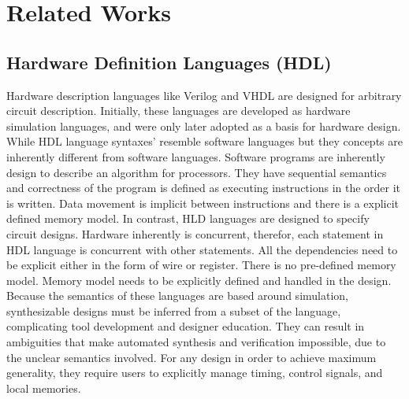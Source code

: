 

\chapter{Related Works}

\section{Hardware Definition Languages (HDL)}

Hardware description languages like Verilog and VHDL are designed for arbitrary circuit description.
Initially, these languages are developed as hardware simulation languages, and were only later adopted as a basis for hardware design.
While HDL language syntaxes' resemble software languages but they concepts are inherently different from software languages.
Software programs are inherently design to describe an algorithm for processors.
They have sequential semantics and correctness of the program is defined as executing instructions in the order it is written. Data movement is implicit between instructions and there is a explicit defined memory model.
In contrast, HLD languages are designed to specify circuit designs.
Hardware inherently is concurrent, therefor, each statement in HDL language is concurrent with other statements.
All the dependencies need to be explicit either in the form of wire or register.
There is no pre-defined memory model. Memory model needs to be explicitly defined and handled in the design.
Because the semantics of these languages are based around simulation, synthesizable designs must be inferred from a subset of the language, complicating tool development and designer education.
They can result in ambiguities that make automated synthesis and verification impossible, due to the unclear semantics involved.
For any design in order to achieve maximum generality, they require users to explicitly manage timing, control signals, and local memories.

